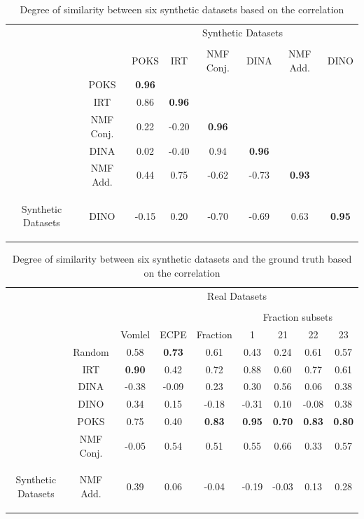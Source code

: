 \begin{table}
\center
\begin{tabular}{c|c|c|c|c|c|c|c|}
\multicolumn{2}{c}{} & \multicolumn{6}{c}{Synthetic Datasets} \tabularnewline
\multicolumn{8}{c}{} \tabularnewline
\cline{3-8} 
\multicolumn{2}{c|}{} & POKS & IRT & NMF Conj. & DINA & NMF Add. & DINO\tabularnewline
\cline{2-8}
\cline{2-3}
&POKS & \textbf {0.96} & \multicolumn{1}{|c}{} & \multicolumn{1}{c}{} & \multicolumn{1}{c}{} & \multicolumn{1}{c}{}\tabularnewline
\cline{2-4}
&IRT & 0.86 & \textbf {0.96} & \multicolumn{1}{|c}{} & \multicolumn{1}{c}{} & \multicolumn{1}{c}{} & \multicolumn{1}{c}{}\tabularnewline
\cline{2-5}
&NMF Conj. & 0.22 & -0.20 & \textbf {0.96} & \multicolumn{1}{|c}{} & \multicolumn{1}{c}{} & \multicolumn{1}{c}{}\tabularnewline
\cline{2-6}
&DINA & 0.02 & -0.40 & 0.94 & \textbf {0.96} & \multicolumn{1}{|c}{} & \multicolumn{1}{c}{}\tabularnewline
\cline{2-7}
&NMF Add. & 0.44 & 0.75 & -0.62 & -0.73 & \textbf {0.93} & \multicolumn{1}{|c}{}\tabularnewline
\cline{2-8}
\multicolumn{1}{c|}{\multirow{-6}{*}{\begin{sideways}Synthetic Datasets\end{sideways}}}&DINO & -0.15 & 0.20 & -0.70 & -0.69 & 0.63 & \textbf {0.95}\tabularnewline
\cline{2-8}
\end{tabular}
\caption{Degree of similarity between six synthetic datasets based on the correlation}
\label{tablSyn}
\end{table}



\begin{table}
 \center
\begin{tabular}{c|c|c|c|c|c|c|c|c|}

\multicolumn{2}{c}{}&\multicolumn{7}{c}{Real Datasets}\tabularnewline   
\multicolumn{9}{c}{}\tabularnewline   
\cline{6-9}
\multicolumn{5}{c|}{}&\multicolumn{4}{c|}{Fraction subsets}   \tabularnewline   
\cline{3-9} 
\multicolumn{2}{c|}{}   & Vomlel &ECPE &Fraction &1&21&22&23\tabularnewline
\cline{2-9}
\cline{2-9}
&Random & 0.58 &\textbf {0.73} & 0.61   & 0.43 & 0.24 & 0.61 & 0.57 \tabularnewline
\cline{2-9}
&IRT & \textbf {0.90} & 0.42 & 0.72   & 0.88 & 0.60 & 0.77 & 0.61 \tabularnewline
\cline{2-9}
&DINA & -0.38  & -0.09 &   0.23 &   0.30 & 0.56 & 0.06 & 0.38 \tabularnewline
\cline{2-9}
&DINO & 0.34 & 0.15  &  -0.18 &  -0.31 & 0.10 & -0.08 & 0.38 \tabularnewline
\cline{2-9}
&POKS & 0.75 &0.40  &  \textbf {0.83}  &  \textbf {0.95} &\textbf {0.70} & \textbf {0.83} & \textbf {0.80}\tabularnewline
\cline{2-9}
 &NMF Conj. & -0.05 & 0.54  & 0.51   & 0.55  & 0.66 & 0.33 & 0.57\tabularnewline
\cline{2-9}
\multicolumn{1}{c|}{\multirow{-7}{*}{\begin{sideways}Synthetic Datasets\end{sideways}}}&NMF Add. & 0.39 &0.06   & -0.04   & -0.19 & -0.03 & 0.13 & 0.28\tabularnewline
\cline{2-9}
\end{tabular}
\caption{Degree of similarity between six synthetic datasets and the ground truth based on the correlation}
\label{tablSynReal}
\end{table}


